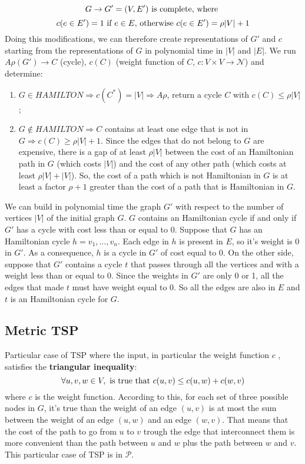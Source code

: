 \[
    G \rightarrow G' = (V, E') \textnormal{ is complete, where }
\]
\[
    c(e \in E') = 1 \textnormal{ if } e \in E \textnormal{, otherwise } c(e \in E') = \rho|V| + 1
\]
Doing this modifications, we can therefore create representations of $G'$ and $c$ starting from the representations of $G$ in polynomial time in $|V|$ and $|E|$.
We run $A\rho(G') \rightarrow C$ \textnormal{(cycle),} $c(C)$ \textnormal{(weight function of $C$, $c: V \times V \rightarrow \mathcal{N}$)} and determine:
\begin{enumerate}
    \item $G \in HAMILTON \Rightarrow c(C^*) = |V| \Rightarrow A\rho$, return a cycle $C$ with $c(C) \le \rho|V|$;
    \item $G \not\in HAMILTON \Rightarrow C$ contains at least one edge that is not in $G \Rightarrow c(C) \ge \rho|V| + 1$. Since the edges that do not belong to $G$ are expensive, there is a gap of at least $\rho |V|$ between the cost of an Hamiltonian path in $G$ (which costs $|V|$) and the cost of any other path (which costs at least $\rho |V| + |V|$). So, the cost of a path which is not Hamiltonian in $G$ is at least a factor $\rho + 1$ greater than the cost of a path that is Hamiltonian in $G$.
\end{enumerate}
\noindent
We can build in polynomial time the graph $G'$ with respect to the number of vertices $|V|$ of the initial graph $G$. $G$ contains an Hamiltonian cycle if and only if $G'$ has a cycle with cost less than or equal to 0. Suppose that $G$ has an Hamiltonian cycle $h = v_1, \dots, v_n$. Each edge in $h$ is present in $E$, so it's weight is 0 in $G'$. As a consequence, $h$ is a cycle in $G'$ of cost equal to 0. On the other side, suppose that $G'$ contains a cycle $t$ that passes through all the vertices and with a weight less than or equal to 0. Since the weights in $G'$ are only 0 or 1, all the edges that made $t$ must have weight equal to 0. So all the edges are also in $E$ and $t$ is an Hamiltonian cycle for $G$.

\subsection{Metric TSP}
Particular case of TSP where the input, in particular the weight function $c$ , satisfies the \textbf{triangular inequality}:
\[
\forall u, v, w \in V, \textnormal{ is true that } c(u, v) \le c(u, w) + c(w, v)
\]
where $c$ is the weight function. According to this, for each set of three possible nodes in $G$, it's true than the weight of an edge $(u, v)$ is at most the sum between the weight of an edge $(u, w)$ and an edge $(w, v)$. That means that the cost of the path to go from $u$ to $v$ trough the edge that interconnect them is more convenient than the path between $u$ and $w$ plus the path between $w$ and $v$. This particular case of TSP is in $\mathcal{P}$.